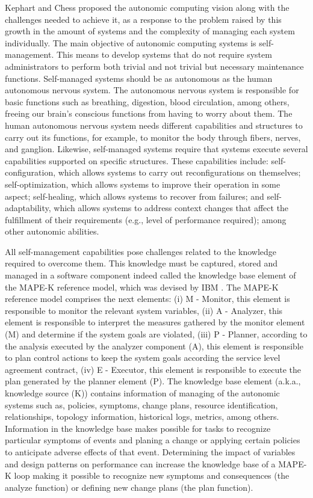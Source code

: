 Kephart and Chess proposed the autonomic computing vision \cite{autonomiccomputing} along with the challenges needed to achieve it, as a response to the problem raised by this growth in the amount of systems and the complexity of managing each system individually. The main objective of autonomic computing systems is self-management. This means to develop systems that do not require system administrators to perform both trivial and not trivial but necessary maintenance functions. Self-managed systems should be as autonomous as the human autonomous nervous system. The autonomous nervous system is responsible for basic functions such as breathing, digestion, blood circulation, among others, freeing our brain's conscious functions from having to worry about them. The human autonomous nervous system needs different capabilities and structures to carry out its functions, for example, to monitor the body through fibers, nerves, and ganglion. Likewise, self-managed systems require that systems execute several capabilities supported on specific structures. These capabilities include: self-configuration, which allows systems to carry out reconfigurations on themselves; self-optimization, which allows systems to improve their operation in some aspect; self-healing, which allows systems to recover from failures; and self-adaptability, which allows systems to address context changes that affect the fulfillment of their requirements (e.g., level of performance required); among other autonomic abilities.

All self-management capabilities pose challenges related to the knowledge required to overcome them. This knowledge must be captured, stored and managed in a software component indeed called the knowledge base element of the MAPE-K reference model, which was devised by IBM \cite{computing2006architectural}. The MAPE-K reference model comprises the next elements: (i) M - Monitor, this element is responsible to monitor the relevant system variables, (ii) A - Analyzer, this element is responsible to interpret the measures gathered by the monitor element (M) and determine if the system goals are violated, (iii) P - Planner, according to the analysis executed by the analyzer component (A), this element is responsible to plan control actions to keep the system goals according the service level agreement contract, (iv) E - Executor, this element is responsible to execute the plan generated by the planner element (P). The knowledge base element (a.k.a., knowledge source (K)) contains information of managing of the autonomic systems such as, policies, symptoms, change plans, resource identification, relationships, topology information, historical logs, metrics, among others. Information in the knowledge base makes possible for tasks to recognize particular symptoms of events and planing a change or applying certain policies to anticipate adverse effects of that event. Determining the impact of variables and design patterns on performance can increase the knowledge base of a MAPE-K loop making it possible to recognize new symptoms and consequences (the analyze function) or defining new change plans (the plan function).

